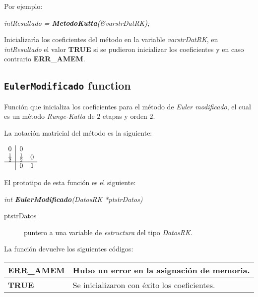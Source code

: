 Por ejemplo:

\begin{center}
\emph{intResultado = \textbf{MetodoKutta}(\&varstrDatRK);}
\end{center}

Inicializar\'{\i}a los coeficientes del m\'etodo en la variable
\emph{varstrDatRK}, en \emph{intResultado} el valor \textbf{TRUE} si se pudieron
inicializar los coeficientes y en caso contrario \textbf{ERR\_AMEM}.

\subsection{\texttt{EulerModificado} function}

Funci\'on que inicializa los coeficientes para el m\'etodo de \emph{Euler 
modificado}, el cual es un m\'etodo \emph{Runge-Kutta} de $2$ etapas y 
orden $2$.\newline

La notaci\'on matricial del m\'etodo es la siguiente:

\begin{center}
$
\begin{array}{c|cc}
0 & 0 \\
\frac{1}{2} & \frac{1}{2} & 0 \\
\hline
 & 0 & 1
\end{array}
$
\end{center}

El prototipo de esta funci\'on es el siguiente:

\begin{center}
\emph{int \textbf{EulerModificado}(DatosRK *ptstrDatos)}
\end{center}

\begin{description}
\item[ptstrDatos] puntero a una variable de \emph{estructura} del tipo
\emph{DatosRK}.
\end{description}

La funci\'on devuelve los siguientes c\'odigos:

\begin{center}
\begin{tabular}{|l|l|}
\hline
\textbf{ERR\_AMEM} & Hubo un error en la asignaci\'on de memoria. \\
\hline
\textbf{TRUE} & Se inicializaron con \'exito los coeficientes. \\
\hline
\end{tabular}
\end{center}

